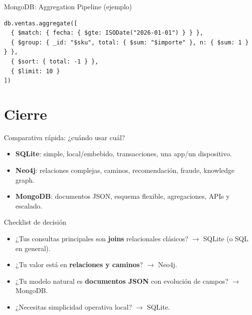\documentclass{beamer}
\begin{document}
\begin{frame}[fragile]{MongoDB: Aggregation Pipeline (ejemplo)}
\begin{verbatim}
db.ventas.aggregate([
  { $match: { fecha: { $gte: ISODate("2026-01-01") } } },
  { $group: { _id: "$sku", total: { $sum: "$importe" }, n: { $sum: 1 } } },
  { $sort: { total: -1 } },
  { $limit: 10 }
])
\end{verbatim}
\end{frame}

\section{Cierre}

\begin{frame}{Comparativa rápida: ¿cuándo usar cuál?}
\begin{itemize}
  \item \textbf{SQLite}: simple, local/embebido, transacciones, una app/un dispositivo.
  \item \textbf{Neo4j}: relaciones complejas, caminos, recomendación, fraude, knowledge graph.
  \item \textbf{MongoDB}: documentos JSON, esquema flexible, agregaciones, APIs y escalado.
\end{itemize}
\end{frame}

\begin{frame}{Checklist de decisión}
\begin{itemize}
  \item ¿Tus consultas principales son \textbf{joins} relacionales clásicos? $\rightarrow$ SQLite (o SQL en general).
  \item ¿Tu valor está en \textbf{relaciones y caminos}? $\rightarrow$ Neo4j.
  \item ¿Tu modelo natural es \textbf{documentos JSON} con evolución de campos? $\rightarrow$ MongoDB.
  \item ¿Necesitas simplicidad operativa local? $\rightarrow$ SQLite.
\end{itemize}
\end{frame}
\end{document}
